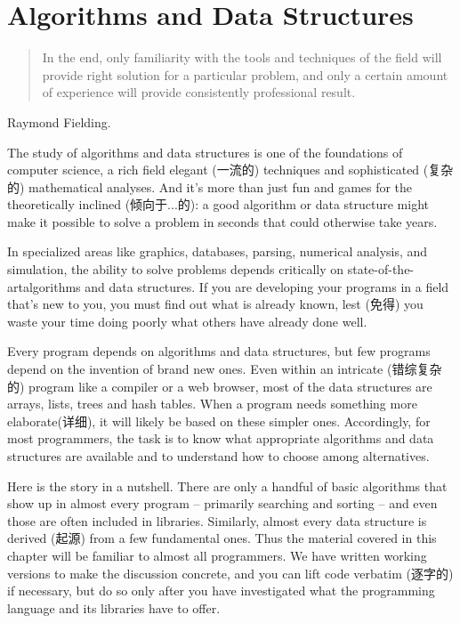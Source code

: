 \chapter{Algorithms and Data Structures}
\label{chap:alds}
\begin{quote}
    In the end, only familiarity with the tools and techniques of the field
    will provide right solution for a particular problem, and only a
    certain amount of experience will provide consistently professional
    result.
\end{quote}
\begin{quotesrc}
    Raymond Fielding.
\end{quotesrc}
The study of algorithms and data structures is one of the foundations of
computer science, a rich field elegant (一流的) techniques and
sophisticated (复杂的) mathematical analyses. And it's more than just fun
and games for the theoretically inclined (倾向于...的): a good algorithm or
data structure might make it possible to solve a problem in seconds that
could otherwise take years.

In specialized areas like graphics, databases, parsing, numerical analysis,
and simulation, the ability to solve problems depends critically on
state-of-the-artalgorithms and data structures. If you are developing your
programs in a field that's new to you, you must find out what is
already known, lest (免得) you waste your time doing poorly what others
have already done well.

Every program depends on algorithms and data structures, but few programs
depend on the invention of brand new ones. Even within an intricate
(错综复杂的) program like a compiler or a web browser, most of the data
structures are arrays, lists, trees and hash tables. When a program needs
something more elaborate(详细), it will likely be based on these simpler
ones. Accordingly, for most programmers, the task is to know what
appropriate algorithms and data structures are available and to understand
how to choose among alternatives.

Here is the story in a nutshell. There are only a handful of basic
algorithms that show up in almost every program -- primarily searching and
sorting -- and even those are often included in libraries. Similarly,
almost every data structure is derived (起源) from a few fundamental ones.
Thus the material covered in this chapter will be familiar to almost all
programmers. We have written working versions to make the discussion
concrete, and you can lift code verbatim (逐字的) if necessary, but do so
only after you have investigated what the programming language and its
libraries have to offer.

